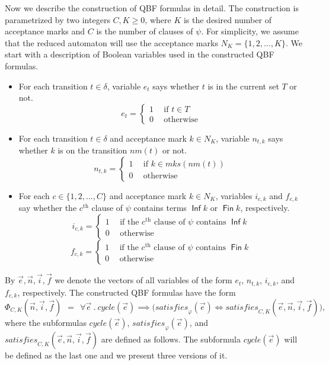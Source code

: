 \documentclass[runningheads]{llncs}
\DeclareMathOperator{\Inf}{\mathsf{Inf}}
\DeclareMathOperator{\Fin}{\mathsf{Fin}}
\newcommand{\mks}{\mathit{mks}}
\newcommand{\rem}{\mathit{nm}}
\newcommand{\mcycle}{\mathit{cycle}}
\newcommand{\msat}{\mathit{satisfies}}
\begin{document}
Now we describe the construction of QBF formulas in detail. The
construction is parametrized by two integers $C,K\ge 0$, where $K$ is
the desired number of acceptance marks and $C$ is the number of
clauses of $\psi$. For simplicity, we assume that the reduced
automaton will use the acceptance marks $N_K=\{1,2,\ldots,K\}$.
We start with a description of Boolean variables used in the
constructed QBF formulas.
\begin{itemize}
\item For each transition $t\in\delta$, variable $e_t$ says whether
  $t$ is in the current set $T$ or not.
  \[e_t=\left\{
      \begin{array}{ll}
        1~~ & \textrm{if }t\in T\\[.5ex]
        0 & \textrm{otherwise}    
      \end{array}\right.
  \]
\item For each transition $t\in\delta$ and acceptance mark $k\in N_K$,
  variable $n_{t,k}$ says whether $k$ is on the transition
  $\rem(t)$ or not.
  \[n_{t,k}=\left\{
      \begin{array}{ll}
        1~~ & \textrm{if }k\in\mks(\rem(t))\\[.5ex]
        0 & \textrm{otherwise}    
      \end{array}\right.
  \]
\item For each $c\in\{1,2,\ldots,C\}$ and acceptance mark $k\in N_K$,
  variables $i_{c,k}$ and $f_{c,k}$ say whether the $c^\textrm{th}$
  clause of $\psi$ contains terms $\Inf k$ or $\Fin k$, respectively.
  \[i_{c,k}=\left\{
      \begin{array}{ll}
        1~~ & \textrm{if the $c^\textrm{th}$ clause of $\psi$ contains $\Inf k$}\\[.5ex]
        0 & \textrm{otherwise}    
      \end{array}\right.
  \]
  \[f_{c,k}=\left\{
      \begin{array}{ll}
        1~~ & \textrm{if the $c^\textrm{th}$ clause of $\psi$ contains $\Fin k$}\\[.5ex]
        0 & \textrm{otherwise}    
      \end{array}\right.
  \]

\end{itemize}
By $\vec{e},\vec{n},\vec{i},\vec{f}$ we denote the vectors of all
variables of the form $e_t$, $n_{t,k}$, $i_{c,k}$, and $f_{c,k}$,
respectively. The constructed QBF formulas have the form 
\[
  \Phi_{C,K}(\vec{n},\vec{i},\vec{f})~~=~~\forall \vec{e}~.~\mcycle(\vec{e})\implies\big(\msat_\varphi(\vec{e}) \iff \msat_{C,K}(\vec{e},\vec{n},\vec{i},\vec{f})\big),
\]
where the subformulas $\mcycle(\vec{e})$, $\msat_\varphi(\vec{e})$,
and $\msat_{C,K}(\vec{e},\vec{n},\vec{i},\vec{f})$ are defined
as follows. The subformula $\mcycle(\vec{e})$ will be defined as the last
one and we present three versions of it.
\end{document}
